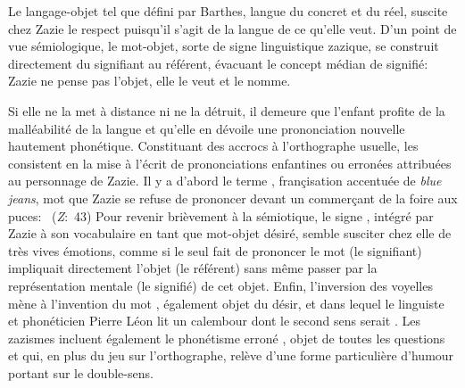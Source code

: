 Le langage-objet tel que défini par Barthes, langue du concret et du réel, suscite chez Zazie le respect puisqu'il s'agit de la langue de ce qu'elle veut.
D'un point de vue sémiologique, le mot-objet, sorte de signe linguistique zazique, se construit directement du signifiant au référent, évacuant le concept médian de signifié: Zazie ne pense pas l'objet, elle le veut et le nomme.
\par
Si elle ne la met à distance ni ne la détruit, il demeure que l'enfant profite de la malléabilité de la langue et qu'elle en dévoile une prononciation nouvelle hautement phonétique.
Constituant des accrocs à l'orthographe usuelle, les  consistent en la mise à l'écrit de prononciations enfantines ou erronées attribuées au personnage de Zazie.
Il y a d'abord le terme , françisation accentuée de \textit{blue jeans}, mot que Zazie se refuse de prononcer devant un commerçant de la foire aux puces: ~(\textit{Z}:~43)
Pour revenir brièvement à la sémiotique, le signe , intégré par Zazie à son vocabulaire en tant que mot-objet désiré, semble susciter chez elle de très vives émotions, comme si le seul fait de prononcer le mot (le signifiant) impliquait directement l'objet (le référent) sans même passer par la représentation mentale (le signifié) de cet objet.
Enfin, l'inversion des voyelles mène à l'invention du mot , également objet du désir, et dans lequel le linguiste et phonéticien Pierre Léon lit un calembour dont le second sens serait .
Les zazismes incluent également le phonétisme erroné , objet de toutes les questions et qui, en plus du jeu sur l'orthographe, relève d'une forme particulière d'humour portant sur le double-sens.

